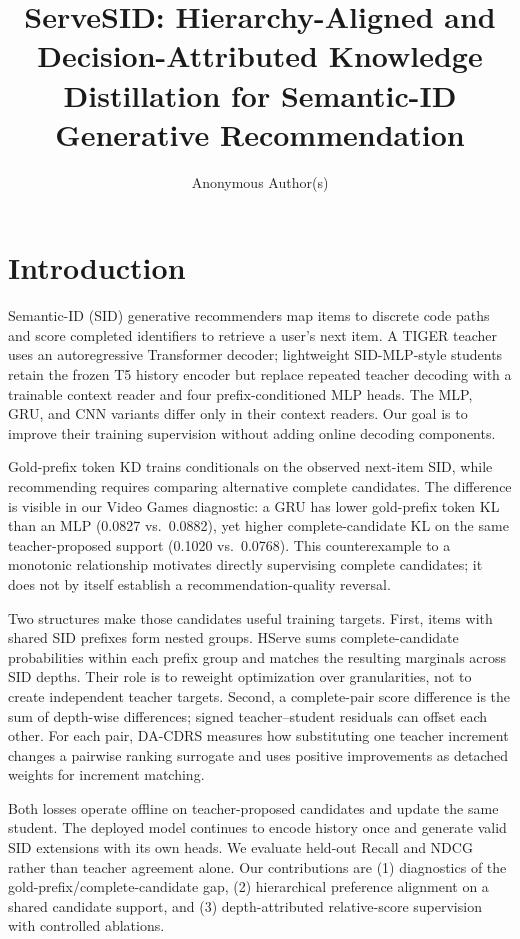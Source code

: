 \documentclass[sigconf, anonymous, review]{acmart}
\title{ServeSID: Hierarchy-Aligned and Decision-Attributed Knowledge
Distillation for Semantic-ID Generative Recommendation}
\author{Anonymous Author(s)}
\affiliation{%
  \institution{Anonymous Institution}
  \city{Anonymous City}
  \country{Anonymous Country}
}
\begin{document}
\maketitle

\section{Introduction}
\label{sec:intro}

Semantic-ID (SID) generative recommenders map items to discrete
code paths and score completed identifiers to retrieve a user's next
item. A TIGER teacher \citep{tiger} uses an autoregressive Transformer
decoder; lightweight SID-MLP-style students \citep{sidmlp} retain the
frozen T5 history encoder but replace repeated teacher decoding with
a trainable context reader and four prefix-conditioned MLP heads.
The MLP, GRU, and CNN variants differ only in their context readers.
Our goal is to improve their training supervision without adding
online decoding components.

Gold-prefix token KD trains conditionals on the observed next-item
SID, while recommending requires comparing alternative complete
candidates. The difference is visible in our Video Games diagnostic:
a GRU has lower gold-prefix token KL than an MLP (0.0827 vs.\
0.0882), yet higher complete-candidate KL on the same teacher-proposed
support (0.1020 vs.\ 0.0768). This counterexample to a monotonic
relationship motivates directly supervising complete candidates;
it does not by itself establish a recommendation-quality reversal.

Two structures make those candidates useful training targets.
First, items with shared SID prefixes form nested groups.
HServe sums complete-candidate probabilities within each prefix
group and matches the resulting marginals across SID depths.
Their role is to reweight optimization over granularities, not
to create independent teacher targets. Second, a complete-pair
score difference is the sum of depth-wise differences; signed
teacher--student residuals can offset each other. For each pair,
DA-CDRS measures how substituting one teacher increment changes a
pairwise ranking surrogate and uses positive improvements as
detached weights for increment matching.

Both losses operate offline on teacher-proposed candidates and
update the same student. The deployed model continues to encode
history once and generate valid SID extensions with its own heads.
We evaluate held-out Recall and NDCG rather than teacher agreement
alone. Our contributions are (1) diagnostics of the
gold-prefix/complete-candidate gap, (2) hierarchical preference
alignment on a shared candidate support, and (3) depth-attributed
relative-score supervision with controlled ablations.
\end{document}
